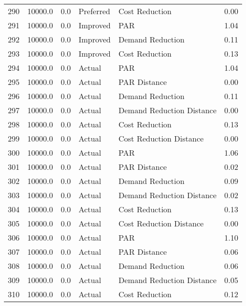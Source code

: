 \begin{longtable}{lrrllr}
290  &      10000.0 &     0.0 &      Preferred &             Cost Reduction &   0.00 \\
291  &      10000.0 &     0.0 &       Improved &                        PAR &   1.04 \\
292  &      10000.0 &     0.0 &       Improved &           Demand Reduction &   0.11 \\
293  &      10000.0 &     0.0 &       Improved &             Cost Reduction &   0.13 \\
294  &      10000.0 &     0.0 &         Actual &                        PAR &   1.04 \\
295  &      10000.0 &     0.0 &         Actual &               PAR Distance &   0.00 \\
296  &      10000.0 &     0.0 &         Actual &           Demand Reduction &   0.11 \\
297  &      10000.0 &     0.0 &         Actual &  Demand Reduction Distance &   0.00 \\
298  &      10000.0 &     0.0 &         Actual &             Cost Reduction &   0.13 \\
299  &      10000.0 &     0.0 &         Actual &    Cost Reduction Distance &   0.00 \\
300  &      10000.0 &     0.0 &         Actual &                        PAR &   1.06 \\
301  &      10000.0 &     0.0 &         Actual &               PAR Distance &   0.02 \\
302  &      10000.0 &     0.0 &         Actual &           Demand Reduction &   0.09 \\
303  &      10000.0 &     0.0 &         Actual &  Demand Reduction Distance &   0.02 \\
304  &      10000.0 &     0.0 &         Actual &             Cost Reduction &   0.13 \\
305  &      10000.0 &     0.0 &         Actual &    Cost Reduction Distance &   0.00 \\
306  &      10000.0 &     0.0 &         Actual &                        PAR &   1.10 \\
307  &      10000.0 &     0.0 &         Actual &               PAR Distance &   0.06 \\
308  &      10000.0 &     0.0 &         Actual &           Demand Reduction &   0.06 \\
309  &      10000.0 &     0.0 &         Actual &  Demand Reduction Distance &   0.05 \\
310  &      10000.0 &     0.0 &         Actual &             Cost Reduction &   0.12 \\

\end{longtable}
